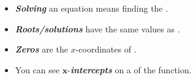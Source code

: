\begin{itemize}[fullwidth]
    \item 
        {\bfseries\itshape Solving} an equation means%
        \dotfill 
        finding the .
    \item 
        {\bfseries\itshape Roots/solutions}%
        \dotfill 
        have the same values as .
    \item 
        {\bfseries\itshape Zeros} are%
        \dotfill 
        the $x$-coordinates of .
    \item 
        You can see $\bm{x}$-{\bfseries\itshape{}intercepts}%
        \dotfill 
        on a  of the function.
\end{itemize}

